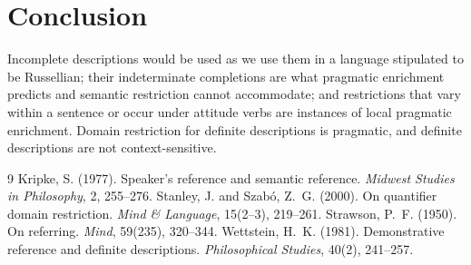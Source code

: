 \documentclass{situationist-preprint}
\begin{document}
\section{Conclusion}

Incomplete descriptions would be used as we use them in a language stipulated to be Russellian; their indeterminate completions are what pragmatic enrichment predicts and semantic restriction cannot accommodate; and restrictions that vary within a sentence or occur under attitude verbs are instances of local pragmatic enrichment. Domain restriction for definite descriptions is pragmatic, and definite descriptions are not context-sensitive.

\begin{thebibliography}{9}\small
{} Kripke, S. (1977). Speaker's reference and semantic reference. \emph{Midwest Studies in Philosophy}, 2, 255--276.
 Stanley, J. and Szab\'o, Z.~G. (2000). On quantifier domain restriction. \emph{Mind \& Language}, 15(2--3), 219--261.
 Strawson, P.~F. (1950). On referring. \emph{Mind}, 59(235), 320--344.
 Wettstein, H.~K. (1981). Demonstrative reference and definite descriptions. \emph{Philosophical Studies}, 40(2), 241--257.
\end{thebibliography}
\end{document}
